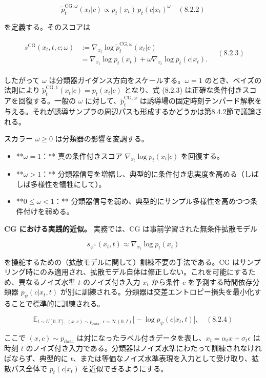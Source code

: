 \[
\tilde{p}_t^{\mathrm{CG},\omega}(x_t|c)\propto p_t(x_t)\,p_t(c|x_t)^\omega
\quad (8.2.2)
\]


を定義する。そのスコアは

\begin{align*}
\begin{aligned}
s^{\mathrm{CG}}(x_t,t,c;\omega)
&:=
\nabla_{x_t}\log\tilde{p}_t^{\mathrm{CG},\omega}(x_t|c)\\
&=
\nabla_{x_t}\log p_t(x_t)+\omega\nabla_{x_t}\log p_t(c|x_t).
\end{aligned}
\quad (8.2.3)
\end{align*}


したがって $\omega$ は分類器ガイダンス方向をスケールする。$\omega=1$ のとき、ベイズの法則により $\tilde{p}_t^{\mathrm{CG},1}(x_t|c)=p_t(x_t|c)$ となり、式 (8.2.3) は正確な条件付きスコアを回復する。一般の $\omega$ に対して、$\tilde{p}_t^{\mathrm{CG},\omega}$ は誘導場の固定時刻テンパード解釈を与える。それが誘導サンプラの周辺パスも形成するかどうかは第8.4.2節で議論される。

スカラー $\omega\ge 0$ は分類器の影響を変調する。

\begin{itemize}
\item **$\omega=1$：** 真の条件付きスコア $\nabla_{x_t}\log p_t(x_t|c)$ を回復する。
\item **$\omega>1$：** 分類器信号を増幅し、典型的に条件付き忠実度を高める（しばしば多様性を犠牲にして）。
\item **$0\le\omega<1$：** 分類器信号を弱め、典型的にサンプル多様性を高めつつ条件付けを弱める。
\end{itemize}


\textbf{CG における実践的近似。} 実務では、CG は事前学習された無条件拡散モデル

\[
s_{\phi^\times}(x_t,t)\approx\nabla_{x_t}\log p_t(x_t)
\]


を操舵するための（拡散モデルに関して）訓練不要の手法である。CG はサンプリング時にのみ適用され、拡散モデル自体は修正しない。これを可能にするため、異なるノイズ水準 $t$ のノイズ付き入力 $x_t$ から条件 $c$ を予測する時間依存分類器 $p_\psi(c|x_t,t)$ が別に訓練される。分類器は交差エントロピー損失を最小化することで標準的に訓練される。

\[
\mathbb{E}_{t\sim U[0,T],\,(x,c)\sim p_{\mathrm{data}},\,\epsilon\sim\mathcal{N}(0,I)}\bigl[-\log p_\psi(c|x_t,t)\bigr],
\quad (8.2.4)
\]


ここで $(x,c)\sim p_{\mathrm{data}}$ は対になったラベル付きデータを表し、$x_t=\alpha_t x+\sigma_t\epsilon$ は時刻 $t$ のノイズ付き入力である。分類器はノイズ水準にわたって訓練されなければならず、典型的に $t$、または等価なノイズ水準表現を入力として受け取り、拡散パス全体で $p_t(c|x_t)$ を近似できるようにする。

